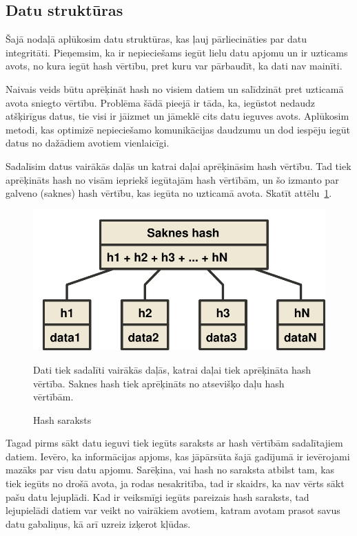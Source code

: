 \subsection{Datu struktūras}
Šajā nodaļā aplūkosim datu struktūras, kas ļauj pārliecināties par datu integritāti. Pieņemsim, ka ir nepieciešams iegūt lielu datu apjomu un ir uzticams avots, no kura iegūt hash vērtību, pret kuru var pārbaudīt, ka dati nav mainīti. 

Naivais veids būtu aprēķināt hash no visiem datiem un salīdzināt pret uzticamā avota sniegto vērtību. Problēma šādā pieejā ir tāda, ka, iegūstot nedaudz atšķirīgus datus, tie visi ir jāizmet un jāmeklē cits datu ieguves avots. Aplūkosim metodi, kas optimizē nepieciešamo komunikācijas daudzumu un dod iespēju iegūt datus no dažādiem avotiem vienlaicīgi.

Sadalīsim datus vairākās daļās un katrai daļai aprēķināsim hash vērtību. Tad tiek aprēķināts hash no visām iepriekš iegūtajām hash vērtībām, un šo izmanto par galveno (saknes) hash vērtību, kas iegūta no uzticamā avota. Skatīt attēlu~\ref{fig:hash-list}.

\begin{figure}[htpb]
    \centering
    \includegraphics[scale=0.5]{teorija/hash-list.pdf}
    \caption{Hash saraksts}
    Dati tiek sadalīti vairākās daļās, katrai daļai tiek aprēķināta hash vērtība. Saknes hash tiek aprēķināts no atsevišķo daļu hash vērtībām.
\label{fig:hash-list}
\end{figure}

Tagad pirms sākt datu ieguvi tiek iegūts saraksts ar hash vērtībām sadalītajiem datiem. Ievēro, ka informācijas apjoms, kas jāpārsūta šajā gadījumā ir ievērojami mazāks par visu datu apjomu. Sarēķina, vai hash no saraksta atbilst tam, kas tiek iegūts no drošā avota, ja rodas nesakritība, tad ir skaidrs, ka nav vērts sākt pašu datu lejuplādi. Kad ir veiksmīgi iegūts pareizais hash saraksts, tad lejupielādi datiem var veikt no vairākiem avotiem, katram avotam prasot savus datu gabaliņus, kā arī uzreiz izķerot kļūdas.


